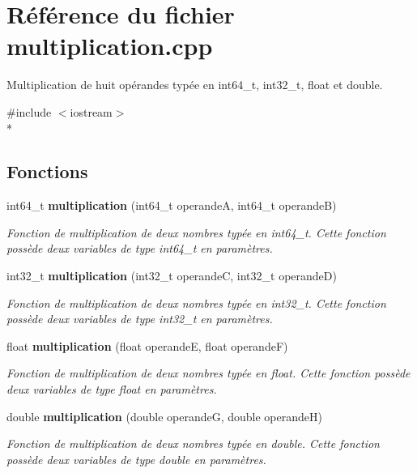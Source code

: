\section{Référence du fichier multiplication.\-cpp}
\label{multiplication_8cpp}


Multiplication de huit opérandes typée en int64\-\_\-t, int32\-\_\-t, float et double.  


{\ttfamily \#include $<$iostream$>$}\\*
\subsection*{Fonctions}
\begin{DoxyCompactItemize}
\item 
int64\-\_\-t {\bf multiplication} (int64\-\_\-t operande\-A, int64\-\_\-t operande\-B)
\begin{DoxyCompactList}\small\item\em Fonction de multiplication de deux nombres typée en int64\-\_\-t. Cette fonction possède deux variables de type int64\-\_\-t en paramètres. \end{DoxyCompactList}\item 
int32\-\_\-t {\bf multiplication} (int32\-\_\-t operande\-C, int32\-\_\-t operande\-D)
\begin{DoxyCompactList}\small\item\em Fonction de multiplication de deux nombres typée en int32\-\_\-t. Cette fonction possède deux variables de type int32\-\_\-t en paramètres. \end{DoxyCompactList}\item 
float {\bf multiplication} (float operande\-E, float operande\-F)
\begin{DoxyCompactList}\small\item\em Fonction de multiplication de deux nombres typée en float. Cette fonction possède deux variables de type float en paramètres. \end{DoxyCompactList}\item 
double {\bf multiplication} (double operande\-G, double operande\-H)
\begin{DoxyCompactList}\small\item\em Fonction de multiplication de deux nombres typée en double. Cette fonction possède deux variables de type double en paramètres. \end{DoxyCompactList}\end{DoxyCompactItemize}


